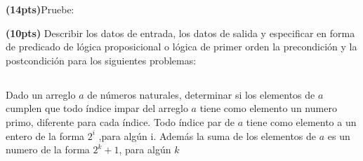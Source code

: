 \documentclass[12pt, a4paper]{exam}
\begin{document}
\begin{questions}
	\question \textbf{(14pts)}Pruebe: 
	\question \textbf{(10pts)} Describir los datos de entrada, los datos de salida y especificar en forma de predicado de lógica proposicional o lógica de primer orden la precondición y la postcondición para los siguientes problemas:
	\begin{parts}
		\part{} Dado un arreglo $a$ de números naturales, determinar si los elementos de $a$ cumplen que todo índice impar del arreglo $a$ tiene como elemento un numero primo, diferente para cada índice. Todo índice par de $a$ tiene como elemento a un entero de la forma $2^i$ ,para algún i. Además la suma de los elementos de $a$ es un numero de la forma $2^k + 1$, para algún $k$
	\end{parts}
	
        
\end{questions}
\end{document}
